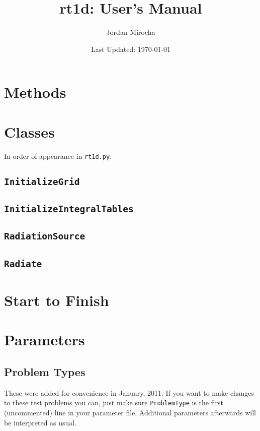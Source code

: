 \documentclass[letterpaper,titlepage,12pt]{article}
\numberwithin{equation}{section}
\begin{document}
	
\author{Jordan Mirocha}	
	
\title{\Large {\bf rt1d: User's Manual}}
\date{Last Updated: \today}
\maketitle

\setcounter{tocdepth}{2}
\tableofcontents
\newpage

\section{Methods}

\section{Classes}
In order of appearance in \texttt{rt1d.py}.

\subsection{\texttt{InitializeGrid}}
\subsection{\texttt{InitializeIntegralTables}}
\subsection{\texttt{RadiationSource}}
\subsection{\texttt{Radiate}}

\section{Start to Finish}

\section{Parameters}

\subsection{Problem Types}
These were added for convenience in January, 2011.  If you want to make changes to these test problems you can, just make sure \texttt{ProblemType} is the first (uncommented) line in your parameter file.  Additional parameters afterwards will be interpreted as usual.
\end{document}
